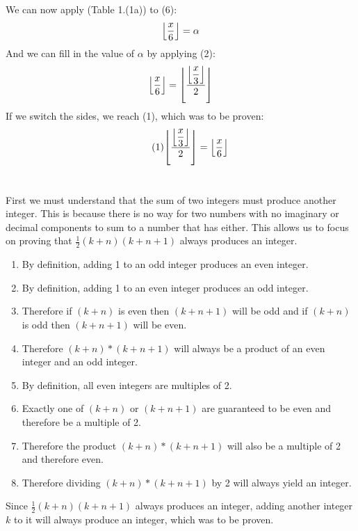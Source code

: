 \documentclass{article}
\DeclarePairedDelimiter{\floor}{\lfloor}{\rfloor}
\begin{document}
We can now apply (Table 1.(1a)) to (6):
\begin{equation*}
    \floor*{\dfrac{x}{6}} = \alpha
\end{equation*}
And we can fill in the value of $\alpha$ by applying (2):
\begin{equation*}
    \floor*{\dfrac{x}{6}} = \floor*{ \frac{\floor*{\dfrac{x}{3}}}{2} }
\end{equation*}
If we switch the sides, we reach (1), which was to be proven:
\begin{equation} \tag{1}
    \floor*{ \frac{\floor*{\dfrac{x}{3}}}{2} } = \floor*{ \frac{x}{6} }
\end{equation}

\section{}
\subsection{}
First we must understand that the sum of two integers must produce another integer. This is because there is no way for two numbers with no imaginary or decimal components to sum to a number that has either. This allows us to focus on proving that $\frac{1}{2}(k+n)(k+n+1)$ always produces an integer.
\begin{enumerate}
    \item By definition, adding 1 to an odd integer produces an even integer.
    \item By definition, adding 1 to an even integer produces an odd integer.
    \item Therefore if $(k+n)$ is even then $(k+n+1)$ will be odd and if $(k+n)$ is odd then $(k+n+1)$ will be even.
    \item Therefore $(k+n)*(k+n+1)$ will always be a product of an even integer and an odd integer.
    \item By definition, all even integers are multiples of 2.
    \item Exactly one of $(k+n)$ or $(k+n+1)$ are guaranteed to be even and therefore be a multiple of 2.
    \item Therefore the product $(k+n)*(k+n+1)$ will also be a multiple of 2 and therefore even.
    \item Therefore dividing $(k+n)*(k+n+1)$ by 2 will always yield an integer.
\end{enumerate}
Since $\frac{1}{2}(k+n)(k+n+1)$ always produces an integer, adding another integer $k$ to it will always produce an integer, which was to be proven.
\end{document}
